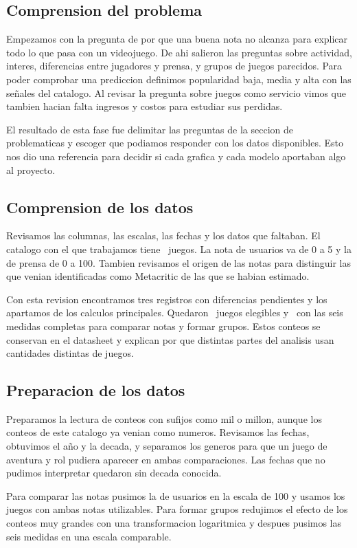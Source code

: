 \documentclass[letterpaper,11pt]{article}
\begin{document}
\subsection{Comprension del problema}
Empezamos con la pregunta de por que una buena nota no alcanza para explicar todo lo que pasa con un videojuego. De ahi salieron las preguntas sobre actividad, interes, diferencias entre jugadores y prensa, y grupos de juegos parecidos. Para poder comprobar una prediccion definimos popularidad baja, media y alta con las señales del catalogo. Al revisar la pregunta sobre juegos como servicio vimos que tambien hacian falta ingresos y costos para estudiar sus perdidas.

El resultado de esta fase fue delimitar las preguntas de la seccion de problematicas y escoger que podiamos responder con los datos disponibles. Esto nos dio una referencia para decidir si cada grafica y cada modelo aportaban algo al proyecto.

\subsection{Comprension de los datos}
Revisamos las columnas, las escalas, las fechas y los datos que faltaban. El catalogo con el que trabajamos tiene \Catalogo\ juegos. La nota de usuarios va de 0 a 5 y la de prensa de 0 a 100. Tambien revisamos el origen de las notas para distinguir las que venian identificadas como Metacritic de las que se habian estimado.

Con esta revision encontramos tres registros con diferencias pendientes y los apartamos de los calculos principales. Quedaron \Elegibles\ juegos elegibles y \Pares\ con las seis medidas completas para comparar notas y formar grupos. Estos conteos se conservan en el datasheet y explican por que distintas partes del analisis usan cantidades distintas de juegos.

\subsection{Preparacion de los datos}
Preparamos la lectura de conteos con sufijos como mil o millon, aunque los conteos de este catalogo ya venian como numeros. Revisamos las fechas, obtuvimos el año y la decada, y separamos los generos para que un juego de aventura y rol pudiera aparecer en ambas comparaciones. Las fechas que no pudimos interpretar quedaron sin decada conocida.

Para comparar las notas pusimos la de usuarios en la escala de 100 y usamos los juegos con ambas notas utilizables. Para formar grupos redujimos el efecto de los conteos muy grandes con una transformacion logaritmica y despues pusimos las seis medidas en una escala comparable.
\end{document}
